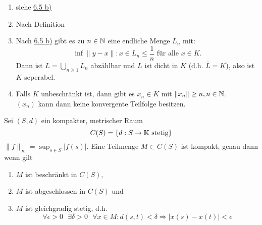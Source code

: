 \begin{beweis}
	\begin{enumerate}[label=\alph*\upshape)]
		\item siehe \hyperref[satz:6.5b]{6.5 b)}
		\item Nach Definition
		\item Nach \hyperref[satz:6.5b]{6.5 b)} gibt es zu $n \in \mathbb{N}$ eine endliche Menge $L_{n}$ mit:
			\[ \inf{\| y - x \| : x \in L_{n}} \leq \frac{1}{n} \text{ für alle } x \in K. \]
			Dann ist $L = \bigcup_{n \geq 1} L_{n}$ abzählbar und $L$ ist dicht in $K$ (d.h. $\overline{L} = K$), also ist $K$ seperabel.
		\item Falls $K$ unbeschränkt ist, dann gibt es $x_{n} \in K$ mit $\|x_{n}\| \geq n, n \in \mathbb{N}$. \\
			$(x_{n})$ kann dann keine konvergente Teilfolge besitzen.
	\end{enumerate}
\end{beweis}


\begin{satz}  \label{satz:6.7-ArzelaAscoli}
	Sei $(S, d)$ ein kompakter, metrischer Raum
	\[ C(S) = \{ d : S \rightarrow \mathbb{K} \text{ stetig} \} \]
	$\| f \|_{\infty} = \sup_{s \in S} | f(s) |$. Eine Teilmenge $M \subset C(S)$ ist kompakt, genau dann wenn gilt
		\begin{enumerate}[label=\alph*\upshape)]
			\item $M$ ist beschränkt in $C(S)$,
			\item $M$ ist abgeschlossen in $C(S)$ und
			\item $M$ ist gleichgradig stetig, d.h.
				\[ \forall \epsilon > 0 \text{ } \exists \delta > 0 \text{ } \forall x \in M: d(s, t) < \delta \Rightarrow | x(s) - x(t) | < \epsilon \]
		\end{enumerate}
\end{satz}

